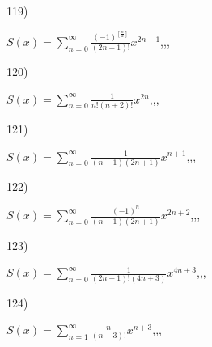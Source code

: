 \documentclass[11pt, ukrainian]{article}
\begin{document}
\par
\vspace{0.9cm}
119) \space 
{%
{$S(x)=\sum\limits_{n=0}^{\infty}{\frac{(-1)^{[\frac{n}{2}]}}{(2n+1)!}}{x^{{2n+1}}}$},,, \par \smallskip  
}
\par
\vspace{0.9cm}
120) \space 
{%
{$S(x)=\sum\limits_{n=0}^{\infty}{\frac{1}{n!(n+2)!}}{x^{{2n}}}$},,, \par \smallskip  
}
\par
\newpage
121) \space 
{%
{$S(x)=\sum\limits_{n=0}^{\infty}{\frac{1}{(n+1)(2n+1)}}{x^{{n+1}}}$},,, \par \smallskip  
}
\par
\vspace{0.9cm}
122) \space 
{%
{$S(x)=\sum\limits_{n=0}^{\infty}{\frac{(-1)^n}{(n+1)(2n+1)}}{x^{{2n+2}}}$},,, \par \smallskip  
}
\par
\vspace{0.9cm}
123) \space 
{%
{$S(x)=\sum\limits_{n=0}^{\infty}{\frac{1}{(2n+1)!(4n+3)}}{x^{{4n+3}}}$},,, \par \smallskip  
}
\par
\vspace{0.9cm}
124) \space 
{%
{$S(x)=\sum\limits_{n=1}^{\infty}{\frac{n}{(n+3)!}}{x^{{n+3}}}$},,, \par \smallskip  
}
\end{document}
